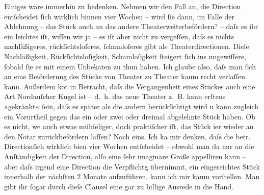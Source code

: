 \pstart
           Einiges wäre immerhin zu bedenken. Nehmen wir den Fall an, die Direction entſcheidet{ }ſich wirklich binnen
               vier Wochen – wird{ }ſie dann, im Falle der Ablehnung – das Stück auch an das andere Theaterweiterbefördern? – daſs es ihr ein leichtes iſt, wiſſen wir
               ja – es iſt aber nicht zu vergeſſen, daſs es nichts nachläßigeres, rückſichtsloſeres,{ }ſchamloſeres gibt als Theaterdirectionen. Dieſe Nachläßigkeit, Rückſichtsloſigkeit,
               Schamloſigkeit{ }ſteigert{ }ſich ins ungewiſſere,{ }ſobald{ }ſie es mit einem Unbeka{\geminationn}ten zu thun haben. Ich glaube also, daſs man{ }ſich an
               eine Beförderung des Stücks
               von Theater zu Theater kaum recht verlaſſen kann. Außerdem {\pb}ko{\geminationm}t in Betracht, daſs die Vergangenheit eines
               Stückes auch eine Art Nordauſcher Kugel ist –
               d. h. das neue Theater z. B.
               kann erſtens »gekränkt«{ }ſein, daſs es später als die andern berückſichtigt wird u
               kann zugleich ein Vorurtheil gegen das ein oder zwei oder dreimal abgelehnte Stück
               haben. Ob es nicht, we{\geminationn} auch etwas mühſeliger, doch
               praktiſcher iſt, das Stück i{\geminationm}er wieder an den Notar zurückbefördern laſſen?
                  {\pb}Noch eins. Ich ka{\geminationn} mir
               denken, daſs die betr. Directionſich wirklich bi{\geminationn}en vier Wochen
               entſcheidet – obwohl man da nur an die Anſtändigkeit der Direction, alſo eine{ }ſehr
               imaginäre Größe appelliren kann – aber daſs irgend eine Direction die Verpflichtg
               übernimmt, ein eingereichtes Stück innerhalb der nächſten 2 Monate aufzuführen, kann
               ich mir kaum vorſtellen. Man gibt ihr{ }ſogar durch dieſe Clausel eine gar zu {\pb}billige Ausrede in die Hand.\pend
           
